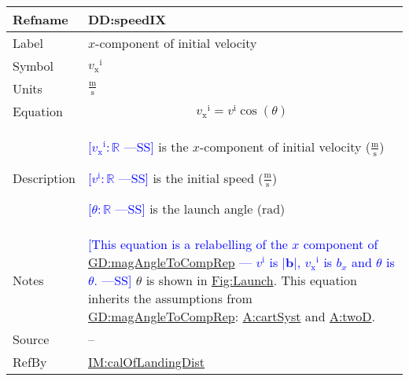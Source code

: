 \documentclass[12pt]{article}
\newcommand{\authornote}[3]{\textcolor{#1}{[#3 ---#2]}}
\newcommand{\authornote}[3]{}
\newcommand{\wss}[1]{\authornote{blue}{SS}{#1}}
\begin{document}
\medskip
\noindent
\begin{minipage}{\textwidth}
\begin{tabular}{>{\raggedright}p{}>{\raggedright\arraybackslash}p{}}
\toprule \textbf{Refname} & \textbf{DD:speedIX}
\label{DD:speedIX}
\\ \midrule
Label & $x$-component of initial velocity
        
\\ \midrule
Symbol & ${{v_{\text{x}}}^{\text{i}}}$
         
\\ \midrule
Units & $\frac{\text{m}}{\text{s}}$
        
\\ \midrule
Equation & \begin{displaymath}
           {{v_{\text{x}}}^{\text{i}}}={v^{\text{i}}} \cos\left(θ\right)
           \end{displaymath}
\\ \midrule
Description & \begin{symbDescription}
              \item{\wss{${{v_{\text{x}}}^{\text{i}}}: \mathbb{R}$} is the $x$-component of initial velocity ($\frac{\text{m}}{\text{s}}$)}
              \item{\wss{${v^{\text{i}}}: \mathbb{R}$} is the initial speed ($\frac{\text{m}}{\text{s}}$)}
              \item{\wss{$θ: \mathbb{R}$} is the launch angle (${\text{rad}}$)}
              \end{symbDescription}
\\ \midrule
Notes & \wss{This equation is a relabelling of the $x$ component of
\hyperref[GD:magAngleToCompRep]{GD:magAngleToCompRep} --- ${v^{\text{i}}}$ is
$|\symbf{b}|$, ${v_{\text{x}}}^{\text{i}}$ is $b_x$ and $\theta$ is $\theta$.}
$θ$ is shown in \hyperref[Figure:Launch]{Fig:Launch}.  This equation inherits the assumptions from \hyperref[GD:magAngleToCompRep]{GD:magAngleToCompRep}: \hyperref[cartSyst]{A:cartSyst} and \hyperref[twoD]{A:twoD}.
        
\\ \midrule
Source & --
         
\\ \midrule
RefBy & \hyperref[IM:calOfLandingDist]{IM:calOfLandingDist}
        
\\ \bottomrule
\end{tabular}
\end{minipage}
~\\
\end{document}
